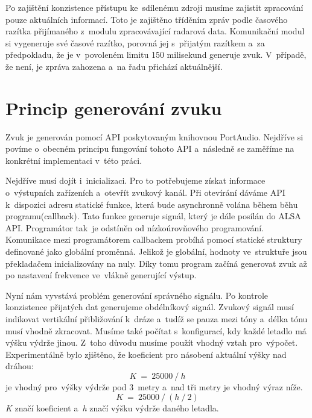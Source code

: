 	Po zajištění konzistence přístupu ke~sdílenému zdroji musíme zajistit zpracování pouze aktuálních informací. Toto je zajištěno tříděním zpráv podle časového razítka přijímaného z~modulu zpracovávající radarová data. Komunikační modul si vygeneruje své časové razítko, porovná jej s~přijatým razítkem a~za předpokladu, že je v~povoleném limitu 150 milisekund generuje zvuk. V~případě, že není, je zpráva zahozena a~na řadu přichází aktuálnější.
 	
	\section{Princip generování zvuku}
	Zvuk je generován pomocí API poskytovaným knihovnou PortAudio. Nejdříve si povíme o~obecném principu fungování tohoto API a~následně se zaměříme na konkrétní implementaci v~této práci.\par
	Nejdříve musí dojít i~inicializaci. Pro to potřebujeme získat informace o~výstupních zařízeních a~otevřít zvukový kanál. Při otevírání dáváme API k~dispozici adresu statické funkce, která bude asynchronně volána během běhu programu(callback). Tato funkce generuje signál, který je dále posílán do ALSA API. Programátor tak~je odstíněn od nízkoúrovňového programování. Komunikace mezi programátorem callbackem probíhá pomocí statické struktury definované jako globální proměnná. Jelikož je globální, hodnoty ve~struktuře jsou překladačem inicializovány na nuly. Díky tomu program začíná generovat zvuk až po nastavení frekvence ve~vlákně generující výstup.\par
	Nyní nám vyvstává problém generování správného signálu. Po kontrole konzistence přijatých dat generujeme obdélníkový signál. Zvukový signál musí indikovat vertikální přibližování k~dráze a~tudíž se pauza mezi tóny a~délka tónu musí vhodně zkracovat. Musíme také počítat s~konfigurací, kdy každé letadlo má výšku výdrže jinou. Z~toho důvodu musíme použít vhodný vztah pro~výpočet. Experimentálně bylo zjištěno, že koeficient pro násobení aktuální výšky nad dráhou: \[K~=~25000~/~h\] je vhodný pro~výšky výdrže pod 3~metry a~nad tři metry je vhodný výraz níže. \[K~=~25000~/~(h~/~2)\]
	\textit{K} značí koeficient a~\textit{h} značí výšku výdrže daného letadla.
	
